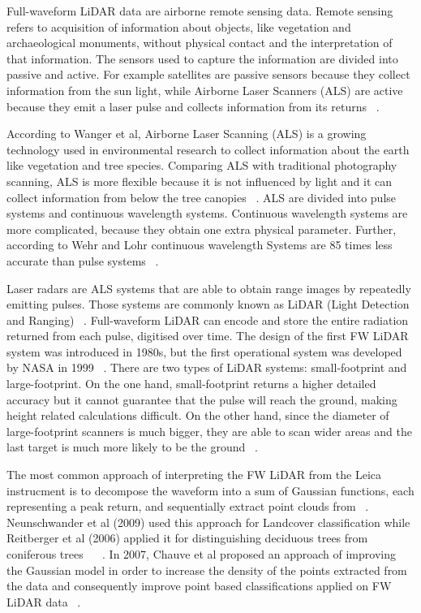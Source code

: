 \documentclass{subfiles}
\begin{document}
	\par Full-waveform LiDAR data are airborne remote sensing data. Remote sensing refers to acquisition of information about objects, like vegetation and archaeological monuments, without physical contact and the interpretation of that information.  The sensors used to capture the information are divided into passive and active. For example satellites are passive sensors because they collect information from the sun light, while Airborne Laser Scanners (ALS) are active because they emit a laser pulse and collects information from its returns ~\cite{Smith2012}.
	
	\par According to Wanger et al, Airborne Laser Scanning (ALS) is a growing technology used in environmental research to collect information about the earth like vegetation and tree species. Comparing ALS with traditional photography scanning, ALS is more flexible because it is not influenced by light and it can collect information from below the tree canopies ~\cite{Wanger2004}. ALS are divided into pulse systems and continuous wavelength systems. Continuous wavelength systems are more complicated, because they obtain one extra physical parameter. Further, according to Wehr and Lohr continuous wavelength Systems are 85 times less accurate than pulse systems ~\cite{Wehr1999}.
	
	\par Laser radars are ALS systems that are able to obtain range images by repeatedly emitting pulses. Those systems are commonly known as LiDAR (Light Detection and Ranging) ~\cite{Wehr1999}. Full-waveform LiDAR can encode and store the entire radiation returned from each pulse, digitised over time. The design of the first FW LiDAR system was introduced in 1980s, but the first operational system was developed by NASA in 1999 ~\cite{Chauve2007}.  There are two types of LiDAR systems: small-footprint and large-footprint. On the one hand, small-footprint returns a higher detailed accuracy but it cannot guarantee that the pulse will reach the ground, making height related calculations difficult. On the other hand, since the diameter of large-footprint scanners is much bigger, they are able to scan wider areas and the last target is much more likely to be the ground ~\cite{Mallet2009}.   
	
	\par The most common approach of interpreting the FW LiDAR from the Leica instrucment is to decompose the waveform into a sum of Gaussian functions, each representing a peak return, and sequentially extract point clouds from ~\cite{Wanger2006}. Neunschwander et al (2009) used this approach for Landcover classification while Reitberger et al (2006) applied it for distinguishing deciduous trees from coniferous trees ~\cite{Neuenschwander2009} ~\cite{Reitberger2008}. In 2007, Chauve et al proposed an approach of improving the Gaussian model in order to increase the density of the points extracted from the data and consequently improve point based classifications applied on FW LiDAR data ~\cite{Chauve2007}. 
	
\end{document}
